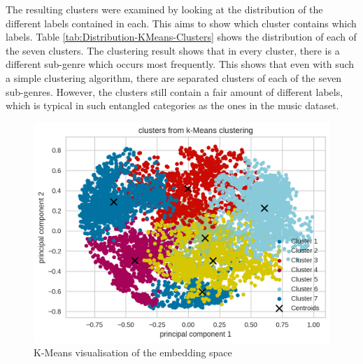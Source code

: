 \newline
\newline
The resulting clusters were examined by looking at the distribution of the different labels contained in each. This aims to show which cluster contains which labels. Table \ref{tab:Distribution-KMeans-Clusters} shows the distribution of each of the seven clusters. The clustering result shows that in every cluster, there is a different sub-genre which occurs most frequently. This shows that even with such a simple clustering algorithm, there are separated clusters of each of the seven sub-genres. However, the clusters still contain a fair amount of different labels, which is typical in such entangled categories as the ones in the music dataset.
\begin{figure}[ht]
\centering
    \includegraphics[width=0.8\linewidth]{img/kmeans_music.png}
    \caption{K-Means visualisation of the embedding space}
    \label{fig:K-Means-Visualisation}
\end{figure}
